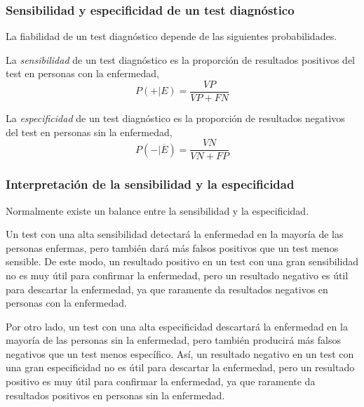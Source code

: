 \begin{frame}
	\frametitle{Sensibilidad y especificidad de un test diagnóstico}
	La fiabilidad de un test diagnóstico depende de las siguientes probabilidades.
	\begin{definicion}[Sensibilidad]
	La \emph{sensibilidad} de un test diagnóstico es la proporción de resultados positivos del test en personas con la enfermedad,
	\[
	P(+|E)=\frac{VP}{VP+FN}
	\]
	\end{definicion}
	
	\begin{definicion}[Especificidad]
	La \emph{especificidad} de un test diagnóstico es la proporción de resultados negativos del test en personas sin la enfermedad,
	\[
	P(-|\overline{E})=\frac{VN}{VN+FP}
	\]
	\end{definicion}
	\end{frame}


\begin{frame}
\frametitle{Interpretación de la sensibilidad y la especificidad}
Normalmente existe un balance entre la sensibilidad y la especificidad. 
	
Un test con una alta sensibilidad detectará la enfermedad en la mayoría de las personas enfermas, pero también dará más falsos positivos que un test menos sensible.
De este modo, un resultado positivo en un test con una gran sensibilidad no es muy útil para confirmar la enfermedad, pero un resultado negativo es útil para descartar la enfermedad, ya que raramente da resultados negativos en personas con la enfermedad.

Por otro lado, un test con una alta especificidad descartará la enfermedad en la mayoría de las personas sin la enfermedad, pero también producirá más falsos negativos que un test menos específico.
Así, un resultado negativo en un test con una gran especificidad no es útil para descartar la enfermedad, pero un resultado positivo es muy útil para confirmar la enfermedad, ya que raramente da resultados positivos en personas sin la enfermedad.
\end{frame}



